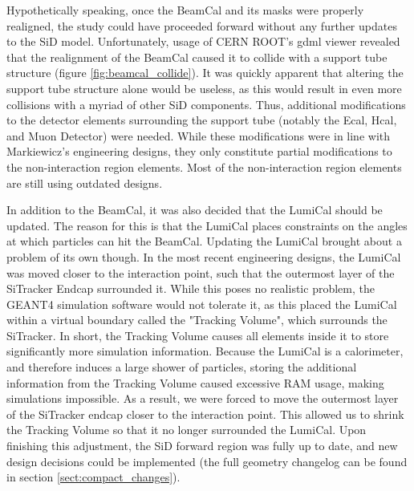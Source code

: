 \documentclass{report}
\begin{document}
            Hypothetically speaking, once the BeamCal and its masks were properly realigned, the study could have proceeded forward without any further updates to the SiD model. Unfortunately, usage of CERN ROOT's gdml viewer revealed that the realignment of the BeamCal caused it to collide with a support tube structure (figure \ref{fig:beamcal_collide}). It was quickly apparent that altering the support tube structure alone would be useless, as this would result in even more collisions with a myriad of other SiD components. Thus, additional modifications to the detector elements surrounding the support tube (notably the Ecal, Hcal, and Muon Detector) were needed. While these modifications were in line with Markiewicz's engineering designs, they only constitute partial modifications to the non-interaction region elements. Most of the non-interaction region elements are still using outdated designs.

            In addition to the BeamCal, it was also decided that the LumiCal should be updated. The reason for this is that the LumiCal places constraints on the angles at which particles can hit the BeamCal. Updating the LumiCal brought about a problem of its own though. In the most recent engineering designs, the LumiCal was moved closer to the interaction point, such that the outermost layer of the SiTracker Endcap surrounded it. While this poses no realistic problem, the GEANT4 simulation software would not tolerate it, as this placed the LumiCal within a virtual boundary called the "Tracking Volume", which surrounds the SiTracker. In short, the Tracking Volume causes all elements inside it to store significantly more simulation information. Because the LumiCal is a calorimeter, and therefore induces a large shower of particles, storing the additional information from the Tracking Volume caused excessive RAM usage, making simulations impossible. As a result, we were forced to move the outermost layer of the SiTracker endcap closer to the interaction point. This allowed us to shrink the Tracking Volume so that it no longer surrounded the LumiCal. Upon finishing this adjustment, the SiD forward region was fully up to date, and new design decisions could be implemented (the full geometry changelog can be found in section \ref{sect:compact_changes}).
\end{document}
